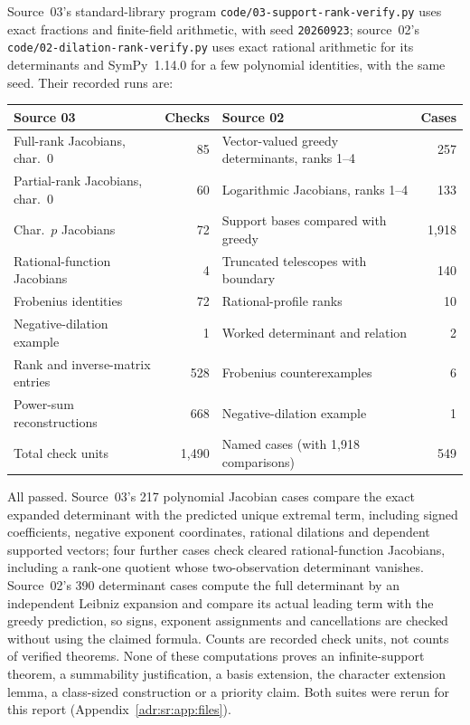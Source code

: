 \documentclass[11pt,letterpaper]{article}
\numberwithin{equation}{section}
\theoremstyle{definition}
\theoremstyle{remark}
\newcommand{\rpath}[1]{\nolinkurl{#1}}%
\begin{document}
Source~03's standard-library program \rpath{code/03-support-rank-verify.py}
uses exact fractions and finite-field arithmetic, with seed
\texttt{20260923}; source~02's \rpath{code/02-dilation-rank-verify.py} uses
exact rational arithmetic for its determinants and SymPy~1.14.0 for a few
polynomial identities, with the same seed. Their recorded runs are:
\begin{center}\small
\begin{tabular}{@{}lr@{\qquad}lr@{}}
\toprule
Source 03 & Checks & Source 02 & Cases\\
\midrule
Full-rank Jacobians, char.\ 0 & 85 & Vector-valued greedy determinants, ranks 1--4 & 257\\
Partial-rank Jacobians, char.\ 0 & 60 & Logarithmic Jacobians, ranks 1--4 & 133\\
Char.\ $p$ Jacobians & 72 & Support bases compared with greedy & 1,918\\
Rational-function Jacobians & 4 & Truncated telescopes with boundary & 140\\
Frobenius identities & 72 & Rational-profile ranks & 10\\
Negative-dilation example & 1 & Worked determinant and relation & 2\\
Rank and inverse-matrix entries & 528 & Frobenius counterexamples & 6\\
Power-sum reconstructions & 668 & Negative-dilation example & 1\\
\midrule
Total check units & 1,490 & Named cases (with 1,918 comparisons) & 549\\
\bottomrule
\end{tabular}
\end{center}
All passed. Source~03's 217 polynomial Jacobian cases compare the exact
expanded determinant with the predicted unique extremal term, including signed
coefficients, negative exponent coordinates, rational dilations and dependent
supported vectors; four further cases check cleared rational-function
Jacobians, including a rank-one quotient whose two-observation determinant
vanishes. Source~02's 390 determinant cases compute the full determinant by an
independent Leibniz expansion and compare its actual leading term with the
greedy prediction, so signs, exponent assignments and cancellations are
checked without using the claimed formula. Counts are recorded check units,
not counts of verified theorems. None of these computations proves an
infinite-support theorem, a summability justification, a basis extension, the
character extension lemma, a class-sized construction or a priority claim.
Both suites were rerun for this report (Appendix~\ref{adr:sr:app:files}).
\end{document}

